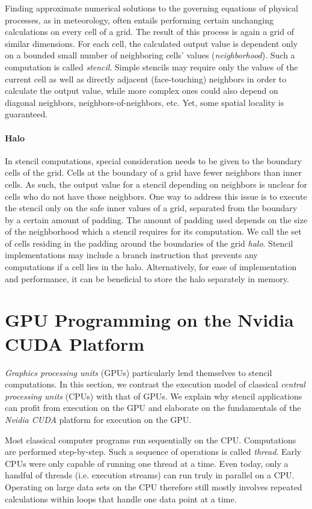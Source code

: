 Finding approximate numerical solutions to the governing equations of physical processes, as in meteorology, often entails performing certain unchanging calculations on every cell of a grid. The result of this process is again a grid of similar dimensions. For each cell, the calculated output value is dependent only on a bounded small number of neighboring cells' values (\emph{neighborhood}). Such a computation is called \emph{stencil}. Simple stencils may require only the values of the current cell as well as directly adjacent (face-touching) neighbors in order to calculate the output value, while more complex ones could also depend on diagonal neighbors, neighbors-of-neighbors, etc. Yet, some spatial locality is guaranteed. 

\paragraph{Halo} \label{sec:halo} In stencil computations, special consideration needs to be given to the boundary cells of the grid. Cells at the boundary of a grid have fewer neighbors than inner cells. As such, the output value for a stencil depending on neighbors is unclear for cells who do not have those neighbors. One way to address this issue is to execute the stencil only on the safe inner values of a grid, separated from the boundary by a certain amount of padding. The amount of padding used depends on the size of the neighborhood which a stencil requires for its computation. We call the set of cells residing in the padding around the boundaries of the grid \emph{halo}. Stencil implementations may include a branch instruction that prevents any computations if a cell lies in the halo. Alternatively, for ease of implementation and performance, it can be beneficial to store the halo separately in memory.

\section{GPU Programming on the Nvidia CUDA Platform}

\emph{Graphics processing units} (GPUs) particularly lend themselves to stencil computations. In this section, we contrast the execution model of classical \emph{central processing units} (CPUs) with that of GPUs. We explain why stencil applications can profit from execution on the GPU and elaborate on the fundamentals of the \emph{Nvidia CUDA} platform for execution on the GPU.

Most classical computer programs run sequentially on the CPU. Computations are performed step-by-step. Such a sequence of operations is called \emph{thread}. Early CPUs were only capable of running one thread at a time. Even today, only a handful of threads (i.e. execution streams) can run truly in parallel on a CPU. Operating on large data sets on the CPU therefore still mostly involves repeated calculations within loops that handle one data point at a time.

